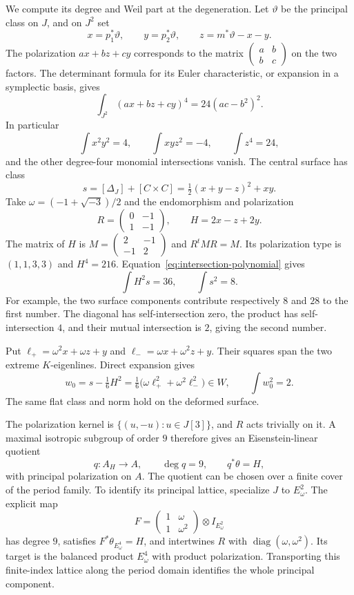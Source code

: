 \documentclass[11pt]{article}
\theoremstyle{definition}
\theoremstyle{remark}
\begin{document}
We compute its degree and Weil part at the degeneration. Let $\vartheta$ be the principal class on $J$, and on $J^2$ set
\[
 x=p_1^*\vartheta,\qquad y=p_2^*\vartheta,\qquad
 z=m^*\vartheta-x-y.
\]
The polarization $a x+b z+c y$ corresponds to the matrix
$\left(\begin{smallmatrix}a&b\\b&c\end{smallmatrix}\right)$ on the two factors. The determinant formula for its Euler characteristic, or expansion in a symplectic basis, gives
\begin{equation}\label{eq:intersection-polynomial}
 \int_{J^2}(a x+b z+c y)^4=24(ac-b^2)^2.
\end{equation}
In particular
\[
 \int x^2y^2=4,\qquad \int xyz^2=-4,\qquad
 \int z^4=24,
\]
and the other degree-four monomial intersections vanish. The central surface has class
\[
 s=[\Delta_J]+[C\times C]
   =\tfrac12(x+y-z)^2+xy.
\]
Take $\omega=(-1+\sqrt{-3})/2$ and the endomorphism and polarization
\[
 R=\begin{pmatrix}0&-1\\1&-1\end{pmatrix},\qquad
 H=2x-z+2y.
\]
The matrix of $H$ is $M=\left(\begin{smallmatrix}2&-1\\-1&2\end{smallmatrix}\right)$ and $R^tMR=M$. Its polarization type is $(1,1,3,3)$ and $H^4=216$. Equation~\eqref{eq:intersection-polynomial} gives
\[
 \int H^2s=36,\qquad \int s^2=8.
\]
For example, the two surface components contribute respectively $8$ and $28$ to the first number. The diagonal has self-intersection zero, the product has self-intersection $4$, and their mutual intersection is $2$, giving the second number.

Put $\ell_+=\omega^2x+\omega z+y$ and
$\ell_-=\omega x+\omega^2z+y$. Their squares span the two extreme $K$-eigenlines. Direct expansion gives
\[
 w_0=s-\tfrac16H^2
   =\tfrac16\bigl(\omega\ell_+^2+\omega^2\ell_-^2\bigr)\in W,
 \qquad \int w_0^2=2.
\]
The same flat class and norm hold on the deformed surface.

The polarization kernel is $\{(u,-u):u\in J[3]\}$, and $R$ acts trivially on it. A maximal isotropic subgroup of order $9$ therefore gives an Eisenstein-linear quotient
\[
 q:A_H\longrightarrow A,\qquad \deg q=9,\qquad q^*\theta=H,
\]
with principal polarization on $A$. The quotient can be chosen over a finite cover of the period family. To identify its principal lattice, specialize $J$ to $E_\omega^2$. The explicit map
\[
 F=\begin{pmatrix}1&\omega\\1&\omega^2\end{pmatrix}
       \otimes I_{E_\omega^2}
\]
has degree $9$, satisfies $F^*\theta_{E_\omega^4}=H$, and intertwines $R$ with $\operatorname{diag}(\omega,\omega^2)$. Its target is the balanced product $E_\omega^4$ with product polarization. Transporting this finite-index lattice along the period domain identifies the whole principal component.
\end{document}

